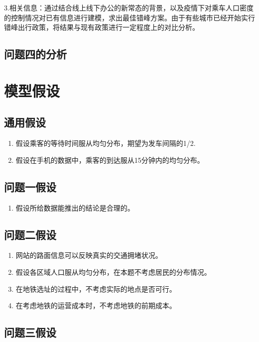 \documentclass[12pt,a4paper]{mcmthesis}
\begin{document}
    3.相关信息：通过结合线上线下办公的新常态的背景，以及疫情下对乘车人口密度的控制情况对已有信息进行建模，求出最佳错峰方案。由于有些城市已经开始实行错峰出行政策，将结果与现有政策进行一定程度上的对比分析。

    \subsection{问题四的分析}


    \section{模型假设}

    \subsection{通用假设}
    \begin{enumerate}
        \item 假设乘客的等待时间服从均匀分布，期望为发车间隔的1/2.
        \item 假设在手机的数据中，乘客的到达服从15分钟内的均匀分布。
    \end{enumerate}

    \subsection{问题一假设}
    \begin{enumerate}
        \item 假设所给数据能推出的结论是合理的。
    \end{enumerate}

    \subsection{问题二假设}
    \begin{enumerate}
        \item 网站的路面信息可以反映真实的交通拥堵状况。
        \item 假设各区域人口服从均匀分布，在本题不考虑居民的分布情况。
        \item 在地铁选址的过程中，不考虑实际的地点是否可行。
        \item 在考虑地铁的运营成本时，不考虑地铁的前期成本。

    \end{enumerate}

    \subsection{问题三假设}
\end{document}
